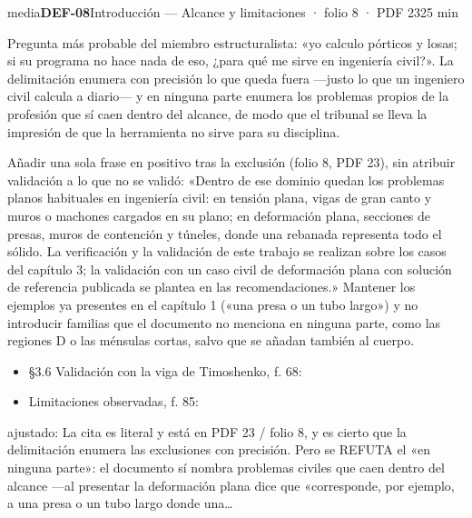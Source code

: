 \begin{ficha}{media}{\casilla\textbf{DEF-08}\quad{}\quad Introducción — Alcance y limitaciones · folio 8 · PDF 23\hfill 25 min}
\par
{}Pregunta más probable del miembro estructuralista: «yo calculo pórticos y losas; si su programa no hace nada de eso, ¿para qué me sirve en ingeniería civil?». La delimitación enumera con precisión lo que queda fuera —justo lo que un ingeniero civil calcula a diario— y en ninguna parte enumera los problemas propios de la profesión que sí caen dentro del alcance, de modo que el tribunal se lleva la impresión de que la herramienta no sirve para su disciplina.\par
{}Añadir una sola frase en positivo tras la exclusión (folio 8, PDF 23), sin atribuir validación a lo que no se validó: «Dentro de ese dominio quedan los problemas planos habituales en ingeniería civil: en tensión plana, vigas de gran canto y muros o machones cargados en su plano; en deformación plana, secciones de presas, muros de contención y túneles, donde una rebanada representa todo el sólido. La verificación y la validación de este trabajo se realizan sobre los casos del capítulo 3; la validación con un caso civil de deformación plana con solución de referencia publicada se plantea en las recomendaciones.» Mantener los ejemplos ya presentes en el capítulo 1 («una presa o un tubo largo») y no introducir familias que el documento no menciona en ninguna parte, como las regiones D o las ménsulas cortas, salvo que se añadan también al cuerpo.\par
{}\begin{itemize}[leftmargin=1.2em,itemsep=1pt,topsep=1pt]
\item {\small §3.6 Validación con la viga de Timoshenko, f. 68: }
\item {\small Limitaciones observadas, f. 85: }
\end{itemize}
{\footnotesize\color{gris}ajustado: La cita es literal y está en PDF 23 /\allowbreak{} folio 8, y es cierto que la delimitación enumera las exclusiones con precisión. Pero se REFUTA el «en ninguna parte»: el documento sí nombra problemas civiles que caen dentro del alcance —al presentar la deformación plana dice que «corresponde, por ejemplo, a una presa o un tubo largo donde una…\par}
\end{ficha}
